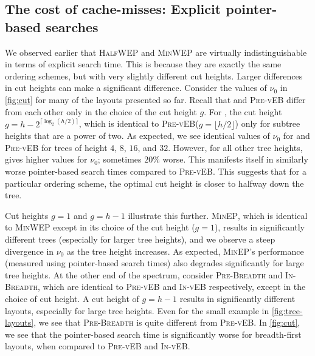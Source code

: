 \documentclass[10pt,conference,letterpaper]{IEEEtran}
\newcommand{\comment}[1]{}
\newcommand{\pvl}{\textsc{Pre-vEB}\xspace}
\newcommand{\ivl}{\textsc{In-vEB}\xspace}
\newcommand{\prebreadth}{\textsc{Pre-Breadth}\xspace}
\newcommand{\inbreadth}{\textsc{In-Breadth}\xspace}
\newcommand{\CEIL}[1]{\ensuremath{\lceil #1 \rceil}\xspace}
\newcommand{\FLOOR}[1]{\ensuremath{\lfloor #1 \rfloor}\xspace}
\newcommand{\pwmean}[1][p]{\ensuremath{\nu_{#1}}\xspace}
\newcommand{\minep}{\textsc{MinEP}\xspace}
\newcommand{\minwep}{\textsc{MinWEP}\xspace}
\newcommand{\halfwep}{\textsc{HalfWEP}\xspace}
\begin{document}
\subsection{The cost of cache-misses: Explicit pointer-based searches}

We observed earlier that \halfwep and \minwep are virtually indistinguishable in terms of explicit search time. This is because they are exactly the same ordering schemes, but with very slightly different cut heights. Larger differences in cut heights can make a significant difference. Consider the values of \pwmean[0] in \autoref{fig:cut} for many of the layouts presented so far. Recall that \bender and \pvl differ from each other only in the choice of the cut height $g$. For \bender, the cut height $g = h - 2^{\CEIL{\log_2(h/2)}}$, which is identical to \pvl ($g = \FLOOR{h/2}$) only for subtree heights that are a power of two. As expected, we see identical values of \pwmean[0] for \bender and \pvl for trees of height $4$, $8$, $16$, and $32$. However, for all other tree heights, \bender gives higher values for \pwmean[0]; sometimes $20\%$ worse. This manifests itself in similarly worse pointer-based search times compared to \pvl. This suggests that for a particular ordering scheme, the optimal cut height is closer to halfway down the tree.
\comment{
for all ordering schemes (combination of in- and pre-order subtrees in the same column in \autoref{tbl:notation}).
}

Cut heights $g=1$ and $g=h-1$ illustrate this further. \minep, which is identical to \minwep except in its choice of the cut height ($g=1$), results in significantly different trees (especially for larger tree heights), and we observe a steep divergence in \pwmean[0] as the tree height increases. 
As expected, \minep's performance (measured using pointer-based search times) also degrades significantly for large tree heights. 
At the other end of the spectrum, consider \prebreadth and \inbreadth, which are identical to \pvl and \ivl respectively, except in the choice of cut height. A cut height of $g=h-1$ results in significantly different layouts, especially for large tree heights. Even for the small example in \autoref{fig:tree-layouts}, we see that \prebreadth is quite different from \pvl. In \autoref{fig:cut}, we see that the pointer-based search time is significantly worse for breadth-first layouts, when compared to \pvl and \ivl. 
\end{document}
